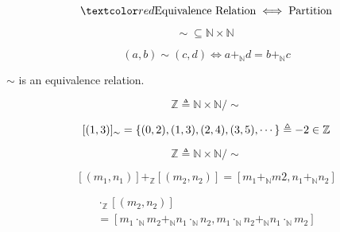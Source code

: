 \begin{frame}{}

  \[
    \red{\text{Equivalence Relation} \iff \text{Partition}}
  \]
\end{frame}

\begin{frame}{}
  \begin{definition}
    \[
      \sim\; \subseteq \mathbb{N} \times \mathbb{N}
    \]

    \[
      (a, b) \sim (c, d) \iff a +_{\mathbb{N}} d = b +_{\mathbb{N}} c
    \]
  \end{definition}

  \pause
  \vspace{0.30cm}
  \begin{theorem}
    $\sim$ is an equivalence relation.
  \end{theorem}

  \pause
  \vspace{0.30cm}
  \begin{center}
  \end{center}

  \pause
  \begin{definition}[$\mathbb{Z}$]
    \[
      \mathbb{Z} \triangleq \mathbb{N} \times \mathbb{N}/\sim
    \]
  \end{definition}

  \pause
  \[
    [(1, 3)]_{\sim} = \{(0, 2), (1, 3), (2, 4), (3, 5), \cdots\} \triangleq -2 \in \mathbb{Z}
  \]
\end{frame}

\begin{frame}{}
  \[
    \mathbb{Z} \triangleq \mathbb{N} \times \mathbb{N}/\sim
  \]
\end{frame}

\begin{frame}{}
  \begin{definition}[$+_\mathbb{Z}$]
    \[
      [(m_1, n_1)] +_{\mathbb{Z}} [(m_2, n_2)] = [m_1 +_{\mathbb{N}} m2, n_1 +_{\mathbb{N}} n_2]
    \]
  \end{definition}

  \pause
  \vspace{0.60cm}
  \begin{definition}
    \begin{gather*}
      [(m_1, n_1)] \cdot_{\mathbb{Z}} [(m_2, n_2)] \\
      = [m_1 \cdot_{\mathbb{N}} m_2 +_{\mathbb{N}} n_1 \cdot_{\mathbb{N}} n_2, 
         m_1 \cdot_{\mathbb{N}} n_2 +_{\mathbb{N}} n_1 \cdot_{\mathbb{N}} m_2]
    \end{gather*}
  \end{definition}
\end{frame}

